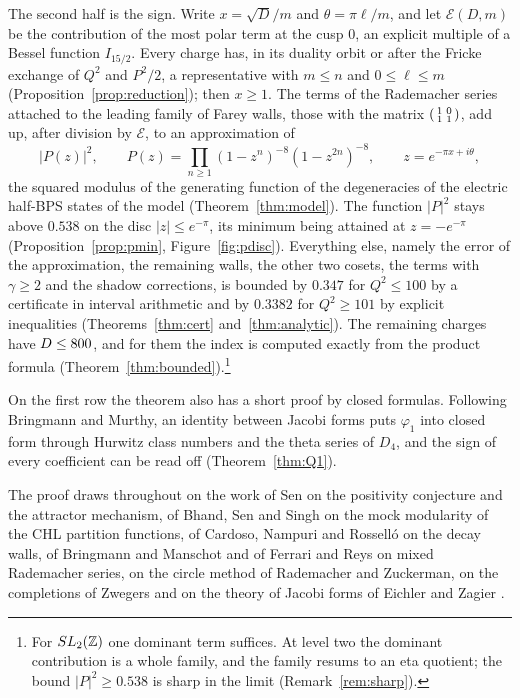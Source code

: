 The second half is the sign. Write $x=\sqrt D/m$ and $\theta=\pi\ell/m$, and let $\mathcal E(D,m)$ be the contribution of the most polar term at the cusp $0$, an explicit multiple of a Bessel function $I_{15/2}$. Every charge has, in its duality orbit or after the Fricke exchange of $Q^2$ and $P^2/2$, a representative with $m\le n$ and $0\le\ell\le m$ (Proposition~\ref{prop:reduction}); then $x\ge1$. The terms of the Rademacher series attached to the leading family of Farey walls, those with the matrix $\begin{psmallmatrix}1&0\\1&1\end{psmallmatrix}$, add up, after division by $\mathcal E$, to an approximation of
\[
|P(z)|^2,\qquad P(z)=\prod_{n\ge1}(1-z^n)^{-8}(1-z^{2n})^{-8},\qquad z=e^{-\pi x+i\theta},
\]
the squared modulus of the generating function of the degeneracies of the electric half-BPS states of the model (Theorem~\ref{thm:model}). The function $|P|^2$ stays above $0.538$ on the disc $|z|\le e^{-\pi}$, its minimum being attained at $z=-e^{-\pi}$ (Proposition~\ref{prop:pmin}, Figure~\ref{fig:pdisc}). Everything else, namely the error of the approximation, the remaining walls, the other two cosets, the terms with $\gamma\ge2$ and the shadow corrections, is bounded by $0.347$ for $Q^2\le100$ by a certificate in interval arithmetic and by $0.3382$ for $Q^2\ge101$ by explicit inequalities (Theorems~\ref{thm:cert} and~\ref{thm:analytic}). The remaining charges have $D\le800$, and for them the index is computed exactly from the product formula (Theorem~\ref{thm:bounded}).\footnote{For $SL_2(\mathbb{Z})$ one dominant term suffices. At level two the dominant contribution is a whole family, and the family resums to an eta quotient; the bound $|P|^2\ge0.538$ is sharp in the limit (Remark~\ref{rem:sharp}).}

On the first row the theorem also has a short proof by closed formulas. Following Bringmann and Murthy, an identity between Jacobi forms puts $\varphi_1$ into closed form through Hurwitz class numbers and the theta series of $D_4$, and the sign of every coefficient can be read off (Theorem~\ref{thm:Q1}).

The proof draws throughout on the work of Sen on the positivity conjecture and the attractor mechanism, of Bhand, Sen and Singh on the mock modularity of the CHL partition functions, of Cardoso, Nampuri and Rossell\'o on the decay walls, of Bringmann and Manschot and of Ferrari and Reys on mixed Rademacher series, on the circle method of Rademacher and Zuckerman, on the completions of Zwegers and on the theory of Jacobi forms of Eichler and Zagier \cite{EZ85}.

